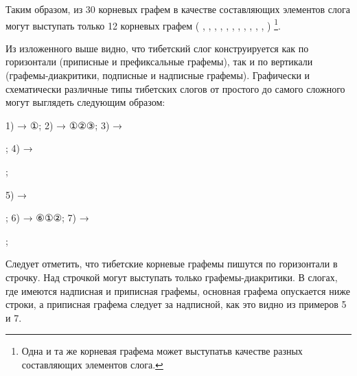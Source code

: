 Таким образом, из 30 корневых графем в качестве составляющих элементов слога могут выступать только 12 корневых графем ( , , , , , , , , , , ,  ) \footnote[10]{Одна и та же корневая графема может выступатьв качестве разных составляющих элементов слога.}.

Из изложенного выше видно, что тибетский слог конструируется как по горизонтали (приписные и префиксальные графемы), так и по вертикали (графемы-диакритики, подписные и надписные графемы). Графически и схематически различные типы тибетских слогов от простого до самого сложного могут выглядеть следующим образом:

1)  {\unifont →} {\unifont ①}; 2)  {\unifont →} {\unifont ①②③};
3)  {\unifont →}
;
4)  {\unifont →}
;

5)  {\unifont →}
;
6)  {\unifont →} {\unifont ⑥①②};
7)  {\unifont →}
;

Следует отметить, что тибетские корневые графемы пишутся по горизонтали в строчку. Над строчкой могут выступать только графемы-диакритики. В слогах, где имеются надписная и приписная графемы, основная графема опускается ниже строки, а приписная графема следует за надписной, как это видно из примеров 5 и 7.

